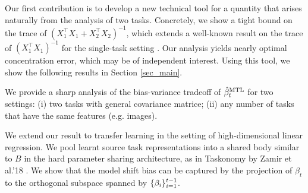 Our first contribution is to develop a new technical tool for a quantity that arises naturally from the analysis of two tasks.
Concretely, we show a tight bound on the trace of $(X_1^{\top}X_1 + X_2^{\top}X_2)^{-1}$, which extends a well-known result on the trace of $(X_1^{\top}X_1)^{-1}$ for the single-task setting \cite{S07}.
Our analysis yields nearly optimal concentration error, which may be of independent interest.
Using this tool, we show the following results in Section \ref{sec_main}.
\squishlist
	\item We provide a sharp analysis of the bias-variance tradeoff of $\hat{\beta}_t^{\text{MTL}}$ for two settings:
(i) two tasks with general covariance matrice; (ii) any number of tasks that have the same features (e.g. images).
	\item We extend our result to transfer learning in the setting of high-dimensional linear regression.
	We pool learnt source task representations into a shared body similar to $B$ in the hard parameter sharing architecture, as in Taskonomy by Zamir et al.'18 \cite{ZSSGM18}.
	We show that the model shift bias can be captured by the projection of $\beta_t$ to the orthogonal subspace spanned by $\{\beta_i\}_{i=1}^{t-1}$.
\squishend

